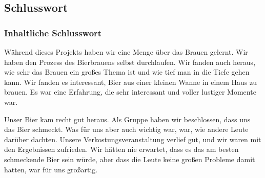 \subsection{Schlusswort}
\subsubsection{Inhaltliche Schlusswort}
Während dieses Projekts haben wir eine Menge über das Brauen gelernt. Wir haben den Prozess des Bierbrauens selbst durchlaufen. Wir fanden auch heraus, wie sehr das Brauen ein großes Thema ist und wie tief man in die Tiefe gehen kann. Wir fanden es interessant, Bier aus einer kleinen Wanne in einem Haus zu brauen. Es war eine Erfahrung, die sehr interessant und voller lustiger Momente war. 

Unser Bier kam recht gut heraus.
 Als Gruppe haben wir beschlossen, dass uns das Bier schmeckt. 
 Was für uns aber auch wichtig war, war, wie andere Leute darüber dachten.
  Unsere Verkostungsveranstaltung verlief gut, und wir waren mit den Ergebnissen zufrieden.
   Wir hätten nie erwartet, dass es das am besten schmeckende Bier sein würde, aber dass die Leute 
   keine großen Probleme damit hatten, war für uns großartig.

